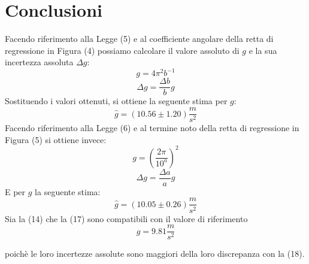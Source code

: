\documentclass[11pt]{article}
\begin{document}
\section{Conclusioni}
Facendo riferimento alla Legge (5) e al coefficiente angolare della retta di regressione in Figura (4) possiamo calcolare il valore assoluto di $g$ e la sua incertezza assoluta $\Delta g$:
\begin{equation}
    g=4\pi^2b^{-1}
\end{equation}
\begin{equation}
    \Delta g = \frac{\Delta b}{b}g
\end{equation}
Sostituendo i valori ottenuti, si ottiene la seguente stima per $g$:
\begin{equation}
    \hat{g} = (10.56\pm 1.20)\frac{m}{s^2}
\end{equation}
Facendo riferimento alla Legge (6) e al termine noto della retta di regressione in Figura (5) si ottiene invece:
\begin{equation}
    g=(\frac{2\pi}{10^a})^2
\end{equation}
\begin{equation}
    \Delta g=\frac{\Delta a}{a}g
\end{equation}
E per $g$ la seguente stima:
\begin{equation}
    \hat{g}=(10.05\pm 0.26)\frac{m}{s^2}
\end{equation}
Sia la (14) che la (17) sono compatibili con il valore di riferimento
\begin{equation}
    g=9.81\frac{m}{s^2}
\end{equation}

poichè le loro incertezze assolute sono maggiori della loro discrepanza con la (18).
\end{document}
